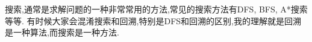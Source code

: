 
\qquad 搜索,通常是求解问题的一种非常常用的方法,常见的搜索方法有DFS, BFS, A*搜索等等. 有时候大家会混淆搜索和回溯,特别是DFS和回溯的区别,我的理解就是回溯是一种算法,而搜索是一种方法.
